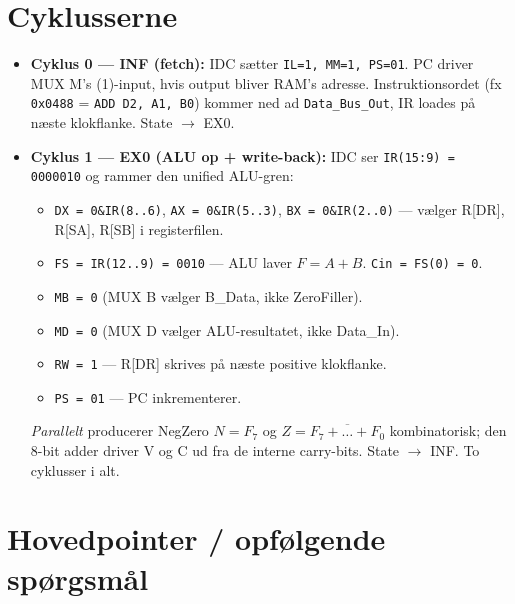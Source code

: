 \documentclass[11pt,a4paper]{article}
\begin{document}
\section*{Cyklusserne}

\begin{itemize}
  \item \textbf{Cyklus 0 --- \textsc{INF} (fetch):}
        IDC sætter \texttt{IL=1, MM=1, PS=01}.
        PC driver MUX M's (1)-input, hvis output bliver RAM's adresse.
        Instruktionsordet (fx \texttt{0x0488} = \texttt{ADD D2, A1, B0}) kommer ned ad
        \texttt{Data\_Bus\_Out}, IR loades på næste klokflanke. State $\rightarrow$ \textsc{EX0}.

  \item \textbf{Cyklus 1 --- \textsc{EX0} (ALU op + write-back):}
        IDC ser \texttt{IR(15:9) = 0000010} og rammer den unified ALU-gren:

        \begin{itemize}
          \item \texttt{DX = 0\&IR(8..6)}, \texttt{AX = 0\&IR(5..3)}, \texttt{BX = 0\&IR(2..0)}
                --- vælger R[DR], R[SA], R[SB] i registerfilen.
          \item \texttt{FS = IR(12..9) = 0010} --- ALU laver $F = A + B$. \texttt{Cin = FS(0) = 0}.
          \item \texttt{MB = 0} (MUX B vælger B\_Data, ikke ZeroFiller).
          \item \texttt{MD = 0} (MUX D vælger ALU-resultatet, ikke Data\_In).
          \item \texttt{RW = 1} --- R[DR] skrives på næste positive klokflanke.
          \item \texttt{PS = 01} --- PC inkrementerer.
        \end{itemize}

        \emph{Parallelt} producerer NegZero \(N = F_7\) og \(Z = \overline{F_7 + \ldots + F_0}\)
        kombinatorisk; den 8-bit adder driver V og C ud fra de interne carry-bits.
        State $\rightarrow$ \textsc{INF}. To cyklusser i alt.
\end{itemize}

\section*{Hovedpointer / opfølgende spørgsmål}
\end{document}
